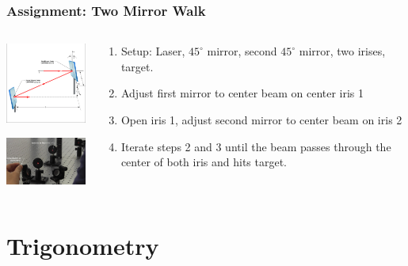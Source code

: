 \documentclass{beamer}
\begin{document}
\begin{frame}\frametitle{Assignment: Two Mirror Walk}
\begin{columns}
\begin{column}{4cm}
\begin{center}
\includegraphics[width=3cm]{fig/twoMirror.jpg}

\vspace{1cm}
\includegraphics[width=4cm]{fig/twoMirror2.jpg}

\end{center}
\end{column}
\begin{column}{7.5cm}
\begin{enumerate}
\item Setup: Laser, $45^{\circ}$ mirror, second $45^{\circ}$ mirror, two irises, target.
\item Adjust first mirror to center beam on center iris 1
\item Open iris 1, adjust second mirror to center beam on iris 2
\item Iterate steps 2 and 3 until the beam passes through the center of both iris and hits target.
\end{enumerate}
\end{column}
\end{columns}

\end{frame}

\section{Trigonometry}
\end{document}
